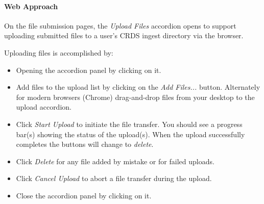 \documentclass[letterpaper,10pt,english]{sphinxmanual}
\begin{document}
\paragraph{Web Approach}
\label{web_site_use:web-approach}
On the file submission pages,  the \emph{Upload Files} accordion opens to support
uploading submitted files to a user's CRDS ingest directory via the browser.
\begin{figure}[htbp]
\centering

\end{figure}

Uploading files is accomplished by:
\begin{itemize}
\item {} 
Opening the accordion panel by clicking on it.

\item {} 
Add files to the upload list by clicking on the \emph{Add Files...} button.  Alternately for modern browsers (Chrome) drag-and-drop files from your desktop to the upload accordion.

\item {} 
Click \emph{Start Upload} to initiate the file transfer.   You should see a progress bar(s) showing the status of the upload(s).   When the upload successfully completes the buttons will change to \emph{delete}.

\item {} 
Click \emph{Delete} for any file added by mistake or for failed uploads.

\item {} 
Click \emph{Cancel Upload} to abort a file transfer during the upload.

\item {} 
Close the accordion panel by clicking on it.

\end{itemize}
\end{document}
